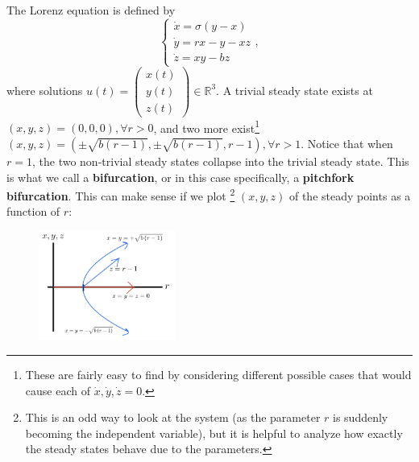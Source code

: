\documentclass[12pt, oneside]{article}
\begin{document}
The Lorenz equation is defined by \[\begin{cases}
  \dot{x} = \sigma(y-x)\\
  \dot{y} = rx-y - xz\\
  \dot{z} = xy - bz
\end{cases},\] where solutions $u(t) = \begin{pmatrix}
  x(t)\\
  y(t)\\
  z(t)
\end{pmatrix} \in \mathbb{R}^3$. A trivial steady state exists at $(x,y,z) = (0,0,0), \forall r > 0$, and two more exist\footnote{These are fairly easy to find by considering different possible cases that would cause each of $\dot{x}, \dot{y}, \dot{z} = 0.$} $(x,y,z) = (\pm \sqrt{b(r-1)}, \pm \sqrt{b(r-1)}, r-1), \forall r > 1$. Notice that when $r = 1$, the two non-trivial steady states collapse into the trivial steady state. This is what we call a \textbf{bifurcation}, or in this case specifically, a \textbf{pitchfork bifurcation}. This can make sense if we plot \footnote{This is an odd way to look at the system (as the parameter $r$ is suddenly becoming the independent variable), but it is helpful to analyze how exactly the steady states behave due to the parameters.} $(x,y,z)$ of the steady points as a function of $r$:
\begin{figure}[h!]
  \centering
  \includegraphics*[width=0.4\textwidth]{figures/example1-2-1a.png}
\end{figure}
\end{document}
